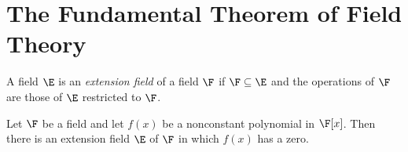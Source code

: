 \section{The Fundamental Theorem of Field Theory}

\begin{definition}
	A field $\E$ is an \textit{extension field} of a field $\F$ if $\F \subseteq \E$ and the operations of $\F$ are those of $\E$ restricted to $\F$.
\end{definition}

\begin{theorem}
	Let $\F$ be a field and let $f(x)$ be a nonconstant polynomial in $\F[x]$. Then there is an extension field $\E$ of $\F$ in which $f(x)$ has a zero.
\end{theorem}
